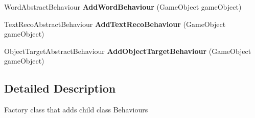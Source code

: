 \begin{DoxyCompactItemize}
\item 
\hypertarget{class_vuforia_1_1_vuforia_behaviour_component_factory_ac6135a9597e28fc462acd34ab6b78748}{}Word\+Abstract\+Behaviour {\bfseries Add\+Word\+Behaviour} (Game\+Object game\+Object)\label{class_vuforia_1_1_vuforia_behaviour_component_factory_ac6135a9597e28fc462acd34ab6b78748}

\item 
\hypertarget{class_vuforia_1_1_vuforia_behaviour_component_factory_ad44d6ac0f592dade204f6024d4681ba6}{}Text\+Reco\+Abstract\+Behaviour {\bfseries Add\+Text\+Reco\+Behaviour} (Game\+Object game\+Object)\label{class_vuforia_1_1_vuforia_behaviour_component_factory_ad44d6ac0f592dade204f6024d4681ba6}

\item 
\hypertarget{class_vuforia_1_1_vuforia_behaviour_component_factory_ab1ae89ecd42c56d350f8e4c8d15610c1}{}Object\+Target\+Abstract\+Behaviour {\bfseries Add\+Object\+Target\+Behaviour} (Game\+Object game\+Object)\label{class_vuforia_1_1_vuforia_behaviour_component_factory_ab1ae89ecd42c56d350f8e4c8d15610c1}

\end{DoxyCompactItemize}


\subsection{Detailed Description}
Factory class that adds child class Behaviours 

